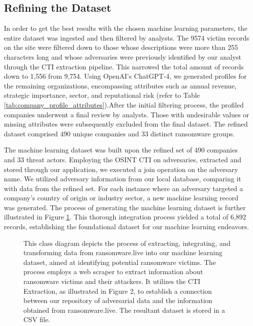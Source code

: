 \subsection{Refining the Dataset}
In order to get the best results with the chosen machine learning parameters, the entire dataset was ingested and then filtered by analysts. The 9574 victim records on the site were filtered down to those whose descriptions were more than 255 characters long and whose adversaries were previously identified by our analyst through the CTI extraction pipeline. This narrowed the total amount of records down to 1,556 from 9,754. Using OpenAI's ChatGPT-4, we generated profiles for the remaining organizations, encompassing attributes such as annual revenue, strategic importance, sector, and reputational risk (refer to Table \ref{tab:company_profile_attributes}).After the initial filtering process, the profiled companies underwent a final review by analysts. Those with undesirable values or missing attributes were subsequently excluded from the final dataset. The refined dataset comprised 490 unique companies and 33 distinct ransomware groups. 

The machine learning dataset was built upon the refined set of 490 companies and 33 threat actors. Employing the OSINT CTI on adversaries, extracted and stored through our application, we executed a join operation on the adversary name. We utilized adversary information from our local database, comparing it with data from the refined set. For each instance where an adversary targeted a company's country of origin or industry sector, a new machine learning record was generated. The process of generating the machine learning dataset is further illustrated in Figure \ref{fig:ml_dataset_generation}. This thorough integration process yielded a total of 6,892 records, establishing the foundational dataset for our machine learning endeavors.

\begin{figure}[H]
  \captionsetup{
    belowskip=-8pt,
  }
  \centering
  \caption[Machine Learning Dataset Generation]{
    This class diagram depicts the process of extracting, integrating, and transforming data from ransomware.live into our machine learning dataset, aimed at identifying potential ransomware victims. The process employs a web scraper to extract information about ransomware victims and their attackers. It utilizes the CTI Extraction, as illustrated in Figure 2, to establish a connection between our repository of adversarial data and the information obtained from ransomware.live. The resultant dataset is stored in a CSV file.
  }
  \label{fig:ml_dataset_generation}
\end{figure}


